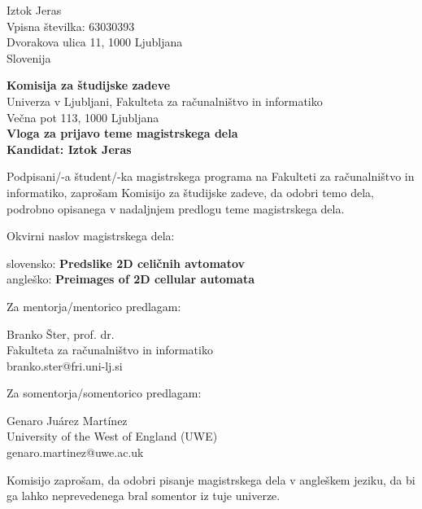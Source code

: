 \documentclass[a4paper, 12pt]{article}
\begin{document}
\noindent
Iztok Jeras\\
Vpisna številka: 63030393\\
Dvorakova ulica 11, 1000 Ljubljana\\
Slovenija


\bigskip

{\bf Komisija za študijske zadeve}\\
Univerza v Ljubljani, Fakulteta za računalništvo in informatiko\\
Večna pot 113, 1000 Ljubljana\\

{\Large\bf
{\centering
    Vloga za prijavo teme magistrskega dela \\%
\large Kandidat: Iztok Jeras \\[10mm]}}


Podpisani/-a študent/-ka magistrskega programa na Fakulteti za računalništvo in informatiko, zaprošam Komisijo za študijske zadeve, da odobri temo dela, podrobno opisanega v nadaljnjem predlogu teme magistrskega dela.

Okvirni naslov magistrskega dela:

\hfill\begin{minipage}{\dimexpr\textwidth-2cm}
slovensko: {\bf Predslike 2D celičnih avtomatov}\\
angleško: {\bf Preimages of 2D cellular automata}
\end{minipage}

Za mentorja/mentorico predlagam:

\hfill\begin{minipage}{\dimexpr\textwidth-2cm}
Branko Šter, prof. dr. \\
Fakulteta za računalništvo in informatiko \\
branko.ster@fri.uni-lj.si
\end{minipage}

Za somentorja/somentorico predlagam:

\hfill\begin{minipage}{\dimexpr\textwidth-2cm}
Genaro Juárez Martínez \\
University of the West of England (UWE) \\
genaro.martinez@uwe.ac.uk \\
\end{minipage}

Komisijo zaprošam, da odobri pisanje magistrskega dela v angleškem jeziku, da bi ga lahko neprevedenega bral somentor iz tuje univerze.
\end{document}
